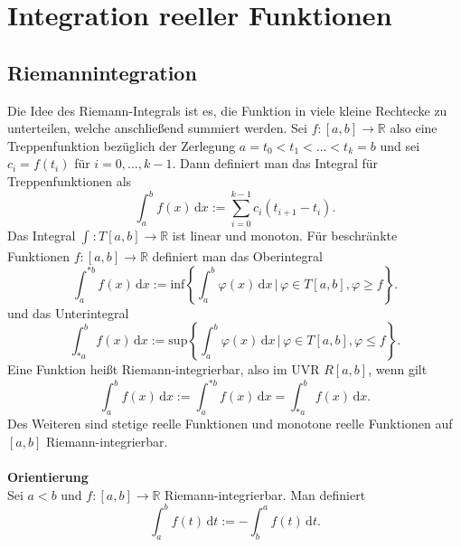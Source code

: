 \documentclass[a4paper,12pt]{article}
\newcommand{\td}{\,\text{d}}
\numberwithin{equation}{section}
\begin{document}
\section{Integration reeller Funktionen}
\subsection{Riemannintegration}
Die Idee des Riemann-Integrals ist es, die Funktion in viele kleine Rechtecke zu unterteilen, welche anschließend summiert werden. Sei $f:[a,b]\rightarrow \mathbb{R}$ also eine Treppenfunktion bezüglich der Zerlegung $a=t_0<t_1<\hdots <t_k=b$ und sei $c_i=f\left(t_i\right)$ für $i=0,\hdots ,k-1$. Dann definiert man das Integral für Treppenfunktionen als
\[ 
        \int_{a}^{b}f\left(x\right)\td x:=\sum_{i=0}^{k-1}c_i\left(t_{i+1}-t_i\right)
.\] 
Das Integral $\int_{}^{}:T[a,b]\rightarrow \mathbb{R}$ ist linear und monoton. Für beschränkte Funktionen $f:[a,b]\rightarrow \mathbb{R}$ definiert man das Oberintegral
\[ 
        \int_{a}^{*b}f\left(x\right)\td x:=\text{inf}\left\{\int_{a}^{b}\varphi \left(x\right)\td x\,|\, \varphi  \in T[a,b],\varphi \geq f\right\}
.\] 
und das Unterintegral
\[ 
        \int_{*a}^{b}f\left(x\right)\td x:=\text{sup}\left\{\int_{a}^{b}\varphi \left(x\right)\td x\,|\, \varphi  \in T[a,b],\varphi \leq f\right\}
.\] 
Eine Funktion heißt Riemann-integrierbar, also im UVR $R[a,b]$, wenn gilt
\[ 
        \int_{a}^{b}f\left(x\right)\td x:=\int_{a}^{*b}f\left(x\right)\td x=\int_{*a}^{b}f\left(x\right)\td x
.\] 
Des Weiteren sind stetige reelle Funktionen und monotone reelle Funktionen auf $[a,b]$ Riemann-integrierbar.
\\\hfill\\\textbf{Orientierung}\\ 
Sei $a<b$ und $f:[a,b]\rightarrow \mathbb{R}$ Riemann-integrierbar. Man definiert
\[ 
         \int_{a}^{b}f\left(t\right)\td t:=-\int_{b}^{a}f\left(t\right)\td t
.\] 
\end{document}
